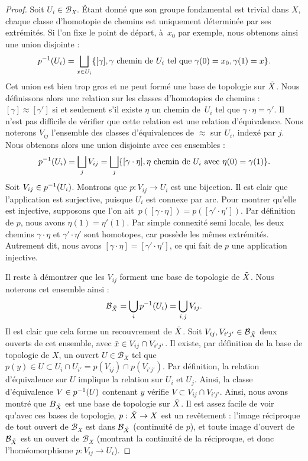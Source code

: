 \begin{proof}
Soit $U_i\in\mathcal{B}_X$. Étant donné que son groupe fondamental est trivial dans $X$, chaque classe d'homotopie de chemins est uniquement déterminée par ses extrémités. Si l'on fixe le point de départ, à~$x_0$ par exemple, nous obtenons ainsi une union disjointe :$$p^{-1}(U_i)=\bigsqcup_{x\in U_i}\{[\gamma],\gamma\text{ chemin de $U_i$ tel que }\gamma(0)=x_0,\gamma(1)=x\}.$$Cet union est bien trop gros et ne peut formé une base de topologie sur $\Tilde{X}$. Nous définissons alors une relation sur les classes d'homotopies de chemins : $[\gamma]\approx[\gamma']$ si et seulement s'il existe $\eta$ un chemin de~$U_i$ tel que $\gamma\cdot\eta=\gamma'$. Il n'est pas difficile de vérifier que cette relation est une relation d'équivalence. Nous noterons $V_{ij}$ l'ensemble des classes d'équivalences de $\approx$ sur $U_i$, indexé par $j$. Nous obtenons alors une union disjointe avec ces ensembles : \[p^{-1}(U_i)=\bigsqcup_{j}V_{ij}=\bigsqcup_j\{[\gamma\cdot\eta],\eta\text{ chemin de $U_i$ avec $\eta(0)=\gamma(1)$}\}.\]Soit $V_{ij}\in p^{-1}(U_i)$. Montrons que $p:V_{ij}\to U_i$ est une bijection. Il est clair que l'application est surjective, puisque $U_i$ est connexe par arc. Pour montrer qu'elle est injective, supposons que l'on ait~$p([\gamma\cdot\eta])=p([\gamma'\cdot\eta'])$. Par définition de $p$, nous avons $\eta(1)=\eta'(1)$. Par simple connexité semi locale, les deux chemins $\gamma\cdot\eta$ et $\gamma'\cdot\eta'$ sont homotopes, car possède les mêmes extrémités. Autrement dit, nous avons $[\gamma\cdot\eta]=[\gamma'\cdot\eta']$, ce qui fait de $p$ une application injective.

Il reste à démontrer que les $V_{ij}$ forment une base de topologie de $\Tilde{X}$. Nous noterons cet ensemble ainsi : $$\mathcal{B}_{\Tilde{X}}=\bigcup_ip^{-1}(U_i)=\bigcup_{i,j}V_{ij}.$$ Il est clair que cela forme un recouvrement de $\Tilde{X}$. Soit $V_{ij},V_{i'j'}\in\mathcal{B}_{\Tilde{X}}$ deux ouverts de cet ensemble, avec $\Tilde{x}\in V_{ij}\cap V_{i'j'}$. Il existe, par définition de la base de topologie de $X$, un ouvert $U\in \mathcal{B}_X$ tel que~${p(y)\in U\subset U_i\cap U_{i'}=p(V_{ij})\cap p(V_{i'j'})}$. Par définition, la relation d'équivalence sur $U$ implique la relation sur $U_i$ et $U_j$. Ainsi, la classe d'équivalence $V\in p^{-1}(U)$ contenant $y$ vérifie $V\subset V_{ij}\cap V_{i'j'}$. Ainsi, nous avons montré que $B_{\Tilde{X}}$ est une base de topologie sur $\Tilde{X}$. Il est assez facile de voir qu'avec ces bases de topologie, $p:\Tilde{X}\to X$ est un revêtement : l'image réciproque de tout ouvert de $\mathcal{B}_X$ est dans $\mathcal{B}_{\Tilde{X}}$ (continuité de $p$), et toute image d'ouvert de $\mathcal{B}_{\Tilde{X}}$ est un ouvert de $\mathcal{B}_X$ (montrant la continuité de la réciproque, et donc l'homéomorphisme $p:V_{ij}\to U_i$).


\end{proof}
